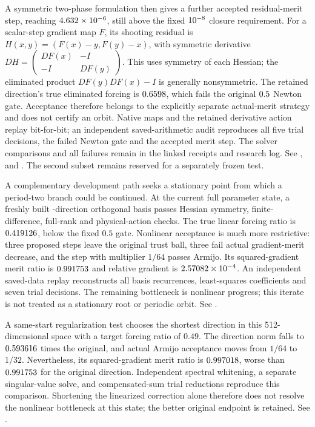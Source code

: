 \documentclass[11pt,letterpaper]{article}
\begin{document}
A symmetric two-phase formulation then gives a further accepted residual-merit step, reaching
$4.632\times10^{-6}$, still above the fixed $10^{-8}$ closure requirement.
For a scalar-step gradient map $F$, its shooting residual is
$H(x,y)=(F(x)-y,F(y)-x)$, with symmetric derivative
$DH=\left(\begin{smallmatrix}DF(x)&-I\\-I&DF(y)\end{smallmatrix}\right)$.
This uses symmetry of each Hessian; the eliminated product $DF(y)DF(x)-I$ is generally nonsymmetric.
The retained direction's true eliminated forcing is $0.6598$, which fails the
original $0.5$ Newton gate. Acceptance therefore belongs to the explicitly
separate actual-merit strategy and does not certify an orbit. Native maps and the retained
derivative action replay bit-for-bit; an independent saved-arithmetic audit reproduces all five trial decisions, the failed Newton gate and the accepted merit step.
The solver comparisons and all failures remain in the linked receipts and research log.
See ,
 and
.
The second subset remains reserved for a separately frozen test.

A complementary development path seeks a stationary point from which a
period-two branch could be continued. At the current full parameter state,
a freshly built \nCifarCurrentBasis{}-direction orthogonal basis passes
Hessian symmetry, finite-difference, full-rank and physical-action checks.
The true linear forcing ratio is $0.419126$, below the fixed
$0.5$ gate. Nonlinear acceptance is much more restrictive: three proposed
steps leave the original trust ball, three fail actual gradient-merit decrease,
and the step with multiplier $1/64$ passes Armijo. Its squared-gradient merit
ratio is $0.991753$ and relative gradient is
$2.57082\times10^{-4}$. An independent saved-data replay reconstructs all
basis recurrences, least-squares coefficients and seven trial decisions.
The remaining bottleneck is nonlinear progress; this iterate is not treated
as a stationary root or periodic orbit. See
.

A same-start regularization test chooses the shortest direction in this
512-dimensional space with a target forcing ratio of $0.49$.
The direction norm falls to $0.593616$ times the original,
and actual Armijo acceptance moves from $1/64$ to $1/32$.
Nevertheless, its squared-gradient merit ratio is
$0.997018$, worse than $0.991753$ for the
original direction. Independent spectral whitening, a separate singular-value
solve, and compensated-sum trial reductions reproduce this comparison.
Shortening the linearized correction alone therefore does not resolve the
nonlinear bottleneck at this state; the better original endpoint is retained.
See .
\end{document}
